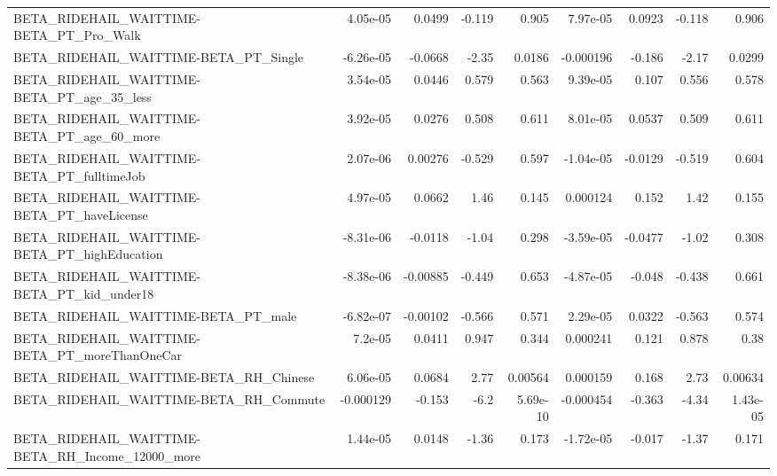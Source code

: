 \begin{tabular}{lrrrrrrrr}
BETA\_RIDEHAIL\_WAITTIME-BETA\_PT\_Pro\_Walk            &    4.05e-05 &       0.0499 &   -0.119 &    0.905 &   7.97e-05 &      0.0923 &       -0.118 &         0.906 \\
BETA\_RIDEHAIL\_WAITTIME-BETA\_PT\_Single              &   -6.26e-05 &      -0.0668 &    -2.35 &   0.0186 &  -0.000196 &      -0.186 &        -2.17 &        0.0299 \\
BETA\_RIDEHAIL\_WAITTIME-BETA\_PT\_age\_35\_less         &    3.54e-05 &       0.0446 &    0.579 &    0.563 &   9.39e-05 &       0.107 &        0.556 &         0.578 \\
BETA\_RIDEHAIL\_WAITTIME-BETA\_PT\_age\_60\_more         &    3.92e-05 &       0.0276 &    0.508 &    0.611 &   8.01e-05 &      0.0537 &        0.509 &         0.611 \\
BETA\_RIDEHAIL\_WAITTIME-BETA\_PT\_fulltimeJob         &    2.07e-06 &      0.00276 &   -0.529 &    0.597 &  -1.04e-05 &     -0.0129 &       -0.519 &         0.604 \\
BETA\_RIDEHAIL\_WAITTIME-BETA\_PT\_haveLicense         &    4.97e-05 &       0.0662 &     1.46 &    0.145 &   0.000124 &       0.152 &         1.42 &         0.155 \\
BETA\_RIDEHAIL\_WAITTIME-BETA\_PT\_highEducation       &   -8.31e-06 &      -0.0118 &    -1.04 &    0.298 &  -3.59e-05 &     -0.0477 &        -1.02 &         0.308 \\
BETA\_RIDEHAIL\_WAITTIME-BETA\_PT\_kid\_under18         &   -8.38e-06 &     -0.00885 &   -0.449 &    0.653 &  -4.87e-05 &      -0.048 &       -0.438 &         0.661 \\
BETA\_RIDEHAIL\_WAITTIME-BETA\_PT\_male                &   -6.82e-07 &     -0.00102 &   -0.566 &    0.571 &   2.29e-05 &      0.0322 &       -0.563 &         0.574 \\
BETA\_RIDEHAIL\_WAITTIME-BETA\_PT\_moreThanOneCar      &     7.2e-05 &       0.0411 &    0.947 &    0.344 &   0.000241 &       0.121 &        0.878 &          0.38 \\
BETA\_RIDEHAIL\_WAITTIME-BETA\_RH\_Chinese             &    6.06e-05 &       0.0684 &     2.77 &  0.00564 &   0.000159 &       0.168 &         2.73 &       0.00634 \\
BETA\_RIDEHAIL\_WAITTIME-BETA\_RH\_Commute             &   -0.000129 &       -0.153 &     -6.2 & 5.69e-10 &  -0.000454 &      -0.363 &        -4.34 &      1.43e-05 \\
BETA\_RIDEHAIL\_WAITTIME-BETA\_RH\_Income\_12000\_more   &    1.44e-05 &       0.0148 &    -1.36 &    0.173 &  -1.72e-05 &      -0.017 &        -1.37 &         0.171 \\

\end{tabular}
